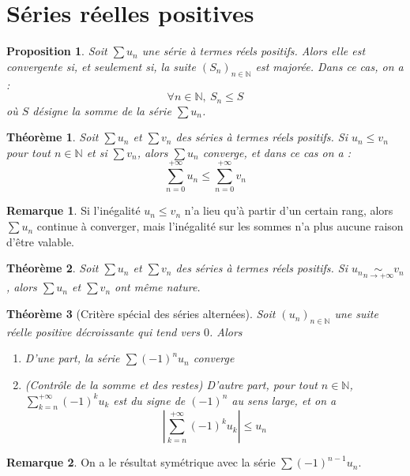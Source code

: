 \documentclass[french]{book}
\newcommand{\N}{\mathbb{N}}
\theoremstyle{plain}
\newtheorem{thm}{Théorème}[chapter]
\newtheorem{prop}{Proposition}[chapter]
\theoremstyle{definition}
\newtheorem{rmq}{Remarque}[chapter]
\theoremstyle{remark}
\begin{document}
\section{Séries réelles positives}
\begin{prop}
	Soit $\displaystyle \sum u_n$ une série à termes réels positifs. Alors elle est convergente si, et seulement si, la suite $(S_n)_{n\in\N}$ est majorée. Dans ce cas, on a : $$\forall n\in\N,\ S_n\leqslant S$$ où $S$ désigne la somme de la série $\displaystyle \sum u_n$.
\end{prop}
\begin{thm}
	Soit $\displaystyle \sum u_n$ et $\displaystyle \sum v_n$ des séries à termes réels positifs. Si $u_n\leqslant v_n$ pour tout $n\in\N$ et si $\displaystyle \sum v_n$, alors $\displaystyle \sum u_n$ converge, et dans ce cas on a : $$\sum_{n=0}^{+\infty}u_n\leqslant\sum_{n=0}^{+\infty}v_n$$
\end{thm}
\begin{rmq} Si l'inégalité $u_n\leqslant v_n$ n'a lieu qu'à partir d'un certain rang, alors $\displaystyle \sum u_n$ continue à converger, mais l'inégalité sur les sommes n'a plus aucune raison d'être valable. \end{rmq}
\begin{thm}
	Soit $\displaystyle \sum u_n$ et $\displaystyle \sum v_n$ des séries à termes réels positifs. Si $\displaystyle u_n \underset{n\to+\infty}{\sim}v_n$, alors $\displaystyle \sum u_n$ et $\displaystyle \sum v_n$ ont même nature.
\end{thm}
\begin{thm}[Critère spécial des séries alternées]
	Soit $(u_n)_{n\in\N}$ une suite réelle positive décroissante qui tend vers $0$. Alors 
	\begin{enumerate}
		\item D'une part, la série $\displaystyle \sum(-1)^nu_n$ converge
		\item (Contrôle de la somme et des restes) D'autre part, pour tout $n\in\N$, $\displaystyle \sum_{k=n}^{+\infty}(-1)^ku_k$ est du signe de $(-1)^n$ au sens large, et on a $$\left\lvert \sum_{k=n}^{+\infty}(-1)^ku_k\right\rvert \leqslant u_n$$
	\end{enumerate}
\end{thm}
\begin{rmq} On a le résultat symétrique avec la série $\displaystyle \sum (-1)^{n-1}u_n$. \end{rmq}
\end{document}
